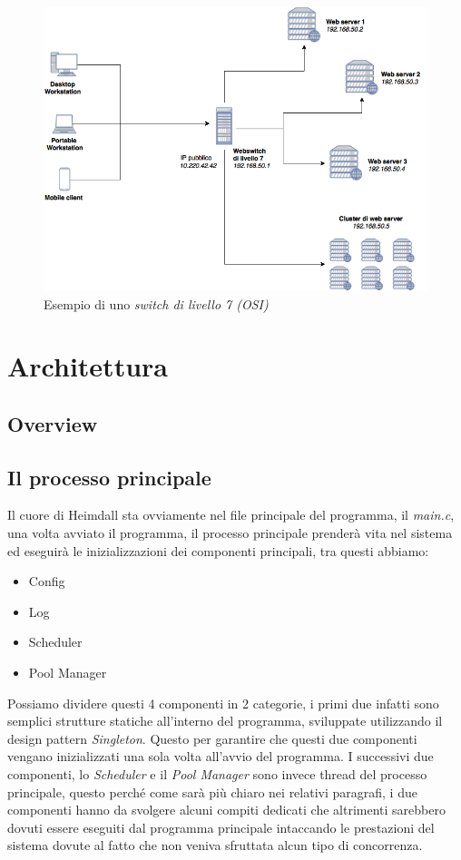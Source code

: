 \documentclass[italian]{tktltiki2}
\begin{document}
\begin{figure}
\centering
\includegraphics[width=\textwidth]{images/switch7}
\caption{Esempio di uno \emph{switch di livello 7 (OSI)}}
\end{figure}

\newpage
\section{Architettura}
\label{sec:architecture}

\subsection{Overview}
\label{ssec:overview}

\subsection{Il processo principale}
\label{ssec:main_process}
Il cuore di Heimdall sta ovviamente nel file principale del programma, il \emph{main.c}, una volta avviato il programma, il processo principale prenderà vita nel sistema ed eseguirà le inizializzazioni dei componenti principali, tra questi abbiamo:

\begin{itemize}
  \item Config
  \item Log
  \item Scheduler
  \item Pool Manager
\end{itemize}
Possiamo dividere questi 4 componenti in 2 categorie, i primi due infatti sono semplici strutture statiche all'interno del programma, sviluppate utilizzando il design pattern \emph{Singleton}. Questo per garantire che questi due componenti vengano inizializzati una sola volta all'avvio del programma. I successivi due componenti, lo \emph{Scheduler} e il \emph{Pool Manager} sono invece thread del processo principale, questo perché come sarà più chiaro nei relativi paragrafi, i due componenti hanno da svolgere alcuni compiti dedicati che altrimenti sarebbero dovuti essere eseguiti dal programma principale intaccando le prestazioni del sistema dovute al fatto che non veniva sfruttata alcun tipo di concorrenza.
\end{document}
